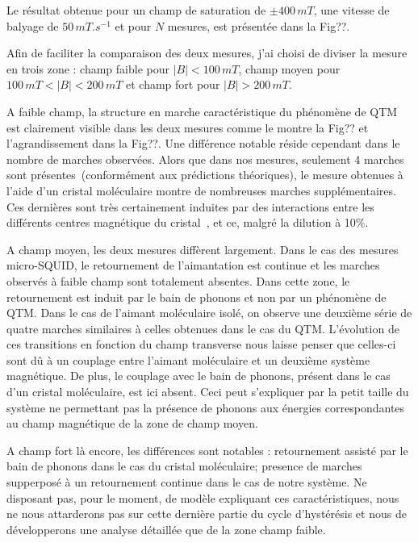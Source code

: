 Le résultat obtenue pour un champ de saturation de $\pm 400 \, mT$, une vitesse de balyage de $50\,mT.s^{-1}$ et pour $N$ mesures, est présentée dans la Fig??.

Afin de faciliter la comparaison des deux mesures, j'ai choisi de diviser la mesure en trois zone : champ faible pour $|B|< 100\,mT$, champ moyen pour $100\,mT<|B|< 200\,mT$ et champ fort pour $|B| > 200\,mT$.

A faible champ, la structure en marche caractéristique du phénomène de QTM~\cite{Thomas1996,Friedman1996} est clairement visible dans les deux mesures comme le montre la Fig?? et l'agrandissement dans la Fig??. Une différence notable réside cependant dans le nombre de marches observées. Alors que dans nos mesures, seulement 4 marches sont présentes~(conformément aux prédictions théoriques), le mesure obtenues à l'aide d'un cristal moléculaire montre de nombreuses marches supplémentaires. Ces dernières sont très certainement induites par des interactions entre les différents centres magnétique du cristal~\cite{Wernsdorfer2002}, et ce, malgré la dilution à 10\%.

A champ moyen, les deux mesures diffèrent largement. Dans le cas des mesures micro-SQUID, le retournement de l'aimantation est continue et les marches observés à faible champ sont totalement absentes. Dans cette zone, le retournement est induit par le bain de phonons et non par un phénomène de QTM. Dans le cas de l'aimant moléculaire isolé, on observe une deuxième série de quatre marches similaires à celles obtenues dans le cas du QTM. L'évolution de ces transitions en fonction du champ transverse nous laisse penser que celles-ci sont d\^u à un couplage entre l'aimant moléculaire et un deuxième système magnétique. De plus, le couplage avec le bain de phonons, présent dans le cas d'un cristal moléculaire, est ici absent. Ceci peut s'expliquer par la petit taille du système ne permettant pas la présence de phonons aux énergies correspondantes au champ magnétique de la zone de champ moyen.

A champ fort là encore, les différences sont notables : retournement assisté par le bain de phonons dans le cas du cristal moléculaire; presence  de marches supperposé à un retournement continue dans le cas de notre système. Ne disposant pas, pour le moment, de modèle expliquant ces caractéristiques, nous ne nous attarderons pas sur cette dernière partie du cycle d’hystérésis et nous de développerons une analyse détaillée que de la zone champ faible.


